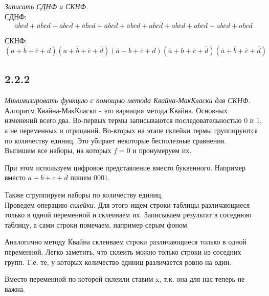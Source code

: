 \documentclass[a4paper,12pt]{article}
\begin{document}
\textit{Записать СДНФ и СКНФ.}
\\

СДНФ:
\[\overline{a}\overline{b}\overline{c}\overline{d} + \overline{a}\overline{b}\overline{c}d + \overline{a}\overline{b}c\overline{d} + \overline{a}\overline{b}cd + \overline{a}b\overline{c}\overline{d} + \overline{a}b\overline{c}d + a\overline{b}\overline{c}\overline{d} + a\overline{b}\overline{c}d + ab\overline{c}\overline{d} + ab\overline{c}d + abc\overline{d}\]

СКНФ:
\[(a + \overline{b} + \overline{c} + d)(a + \overline{b} + \overline{c} + \overline{d})(\overline{a} + b + \overline{c} + d)(\overline{a} + b + \overline{c} + \overline{d})(\overline{a} + \overline{b} + \overline{c} + \overline{d})\]




\subsection*{2.2.2}

\textit{Минимизировать функцию с помощью метода Квайна-МакКласки для СКНФ.}
\\

Алгоритм Квайна-МакКласки - это вариация метода Квайна.
Основных изменений всего два.
Во-первых термы записываются последовательностью 0 и 1, а не переменных и отрицаний.
Во-вторых на этапе склейки термы группируются по количеству единиц.
Это убирает некоторые бесполезные сравнения.
\\

Выпишем все наборы, на которых $f = 0$ и пронумеруем их.

При этом используем цифровое представление вместо буквенного.
Например вместо $a + b + c + \overline{d}$ пишем $0001$.

Также сгруппируем наборы по количеству единиц.
\\

Проведем операцию \emph{склейки}.
Для этого ищем строки таблицы различающиеся только в одной переменной и склеиваем их.
Записываем результат в соседнюю таблицу, а сами строки помечаем, например серым фоном.

Аналогично методу Квайна склеиваем строки различающиеся только в одной переменной.
Легко заметить, что склеить можно только строки из соседних групп.
Т.е. те, у которых количество единиц различается ровно на один.

Вместо переменной по которой склеили ставим x, т.к. она для нас теперь не важна.
\end{document}
